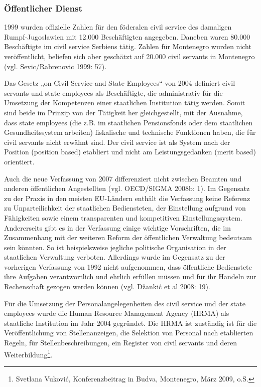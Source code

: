 \subsubsection{Öffentlicher Dienst }
1999 wurden offizielle Zahlen für den föderalen civil service des damaligen Rumpf-Jugoslawien mit 12.000 Beschäftigten angegeben. Daneben waren 80.000 Beschäftigte im civil service Serbiens tätig. Zahlen für Montenegro wurden nicht veröffentlicht, beliefen sich aber geschätzt auf 20.000 civil servants in Montenegro (vgl. Sevic/Rabrenovic 1999: 57).\par
Das Gesetz „on Civil Service and State Employees“ von 2004 definiert civil servants und state employees als Beschäftigte, die administrativ für die Umsetzung der Kompetenzen einer staatlichen Institution tätig werden. Somit sind beide im Prinzip von der Tätigkeit her gleichgestellt, mit der Ausnahme, dass state employees (die z.B. im staatlichen Pensionsfonds oder dem staatlichen Gesundheitssystem arbeiten) fiskalische und technische Funktionen haben, die für civil servants nicht erwähnt sind. Der civil service ist als System nach der Position (position based) etabliert und nicht am Leistungsgedanken (merit based) orientiert. \par
Auch die neue Verfassung von 2007 differenziert nicht zwischen Beamten und anderen öffentlichen Angestellten (vgl. OECD/SIGMA 2008b: 1). Im Gegensatz zu der Praxis in den meisten EU-Ländern enthält die Verfassung keine Referenz zu Unparteilichkeit der staatlichen Bediensteten, der Einstellung aufgrund von Fähigkeiten sowie einem transparenten und kompetitiven Einstellungssystem. Andererseits gibt es in der Verfassung einige wichtige Vorschriften, die im Zusammenhang mit der weiteren Reform der öffentlichen Verwaltung bedeutsam sein könnten. So ist beispielsweise jegliche politische Organisation in der staatlichen Verwaltung verboten. Allerdings wurde im Gegensatz zu der vorherigen Verfassung von 1992 nicht aufgenommen, dass öffentliche Bedienstete ihre Aufgaben verantwortlich und ehrlich erfüllen müssen und für ihr Handeln zur Rechenschaft gezogen werden können (vgl. Džankić et al 2008: 19). \par
Für die Umsetzung der Personalangelegenheiten des civil service und der state employees wurde die Human Resource Management Agency (HRMA) als staatliche Institution im Jahr 2004 gegründet. Die HRMA ist zuständig ist für die Veröffentlichung von Stellenanzeigen, die Selektion von Personal nach etablierten Regeln, für Stellenbeschreibungen, ein Register von civil servants und deren Weiterbildung\footnote{Svetlana Vuković, Konferenzbeitrag in Budva, Montenegro, März 2009, o.S.}.\par	

